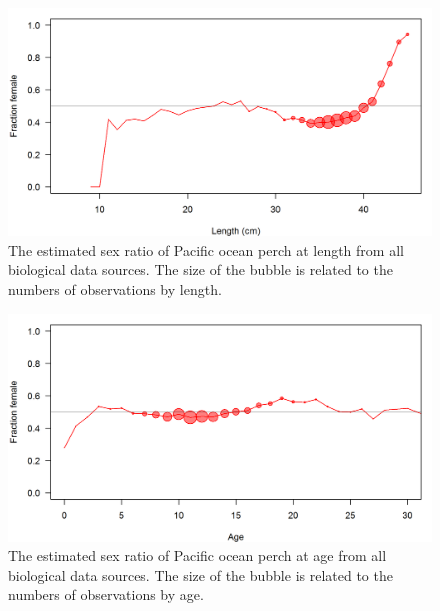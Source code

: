 \documentclass[12pt,]{article}
\begin{document}
\FloatBarrier

\begin{figure}
\centering
\includegraphics{Figures/allSexRatios.png}
\caption{The estimated sex ratio of Pacific ocean perch at length from
all biological data sources. The size of the bubble is related to the
numbers of observations by length. \label{fig:sexratio}}
\end{figure}

\begin{figure}
\centering
\includegraphics{Figures/allSexRatiosAge.png}
\caption{The estimated sex ratio of Pacific ocean perch at age from all
biological data sources. The size of the bubble is related to the
numbers of observations by age. \label{fig:sexratio_Age}}
\end{figure}
\end{document}
